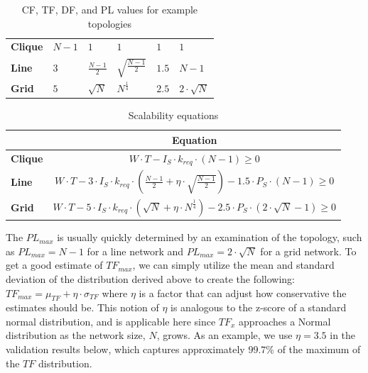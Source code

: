 \begin{table}[]
\centering
\begin{tabular}{l|l|l|l|l|l|}
\cline{2-6}
                            					 & \boldmath{$CF$}  			& \boldmath{$\mu_{TF}$}   			& \boldmath{$\sigma_{TF}$}										& \boldmath{$DF$}			& \boldmath{$PL_{max}$}	\\ \hline
\multicolumn{1}{|l|}{\textbf{Clique}} 	& $N-1$ 						& $1$                            				& $1$                            												& $1$  						& $1$ 					\\ \hline
\multicolumn{1}{|l|}{\textbf{Line}}   	& $3$   							& $\frac{N-1}{2}$ 					& $\sqrt{\frac{N-1}{2}}$ 		& $1.5$						& $N-1$				\\ \hline
\multicolumn{1}{|l|}{\textbf{Grid}}   	& $5$   							& $\sqrt{N}$                       			&$N^{\frac{1}{4}}$							&  $2.5$					& $2 \cdot \sqrt{N}$   	\\ \hline
\end{tabular}
\caption{CF, TF, DF, and PL values for example topologies}
\label{table:rf_ff_sf_values}
\end{table}

\begin{table}[]
\centering
\begin{tabular}{l|l|}
\cline{2-2}
                             & \multicolumn{1}{c|}{{\bf Equation}} \\ \hline
\multicolumn{1}{|l|}{\textbf{Clique}} & \multicolumn{1}{c|}{$W \cdot T - I_S \cdot k_{req} \cdot (N-1) \geq 0$}            \\ \hline
\multicolumn{1}{|l|}{\textbf{Line}}   & \multicolumn{1}{c|}{$W \cdot T - 3 \cdot I_S \cdot k_{req} \cdot (\frac{N-1}{2} + \eta \cdot \sqrt{\frac{N-1}{2}}) - 1.5 \cdot P_S \cdot (N-1) \geq 0$}       \\ \hline
\multicolumn{1}{|l|}{\textbf{Grid}}   & \multicolumn{1}{c|}{$W \cdot T - 5 \cdot I_S \cdot k_{req} \cdot (\sqrt{N} + \eta\cdot N^{\frac{1}{4}}) - 2.5 \cdot P_S \cdot (2 \cdot \sqrt{N} - 1) \geq 0$}      \\ \hline
\end{tabular}
\caption{Scalability equations}
\label{table:scal_eqs}
\end{table}

The $PL_{max}$ is usually quickly determined by an examination of the topology, such as $PL_{max} = N-1$ for a line network and $PL_{max} = 2 \cdot \sqrt{N}$ for a grid network.  To get a good estimate of $TF_{max}$, we can simply utilize the mean and standard deviation of the distribution derived above to create the following: $TF_{max} = \mu_{TF} + \eta \cdot \sigma_{TF}$ where $\eta$ is a factor that can adjust how conservative the estimates should be.  This notion of $\eta$ is analogous to the z-score of a standard normal distribution, and is applicable here since $TF_x$ approaches a Normal distribution as the network size, $N$, grows.  As an example, we use $\eta = 3.5$ in the validation results below, which captures approximately $99.7\%$ of the maximum of the $TF$ distribution.  

